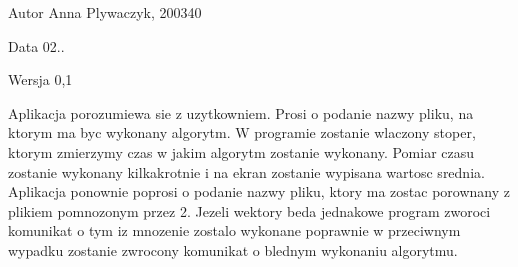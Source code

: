\begin{DoxyAuthor}{Autor}
Anna Plywaczyk, 200340 
\end{DoxyAuthor}
\begin{DoxyDate}{Data}
02.. 
\end{DoxyDate}
\begin{DoxyVersion}{Wersja}
0,1
\end{DoxyVersion}
Aplikacja porozumiewa sie z uzytkowniem. Prosi o podanie nazwy pliku, na ktorym ma byc wykonany algorytm. W programie zostanie wlaczony stoper, ktorym zmierzymy czas w jakim algorytm zostanie wykonany. Pomiar czasu zostanie wykonany kilkakrotnie i na ekran zostanie wypisana wartosc srednia. Aplikacja ponownie poprosi o podanie nazwy pliku, ktory ma zostac porownany z plikiem pomnozonym przez 2. Jezeli wektory beda jednakowe program zworoci komunikat o tym iz mnozenie zostalo wykonane poprawnie w przeciwnym wypadku zostanie zwrocony komunikat o blednym wykonaniu algorytmu. 